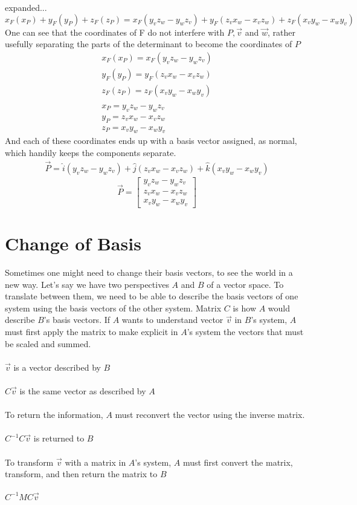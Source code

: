 \documentclass{article}
\begin{document}
expanded...
\[
    x_{F}(x_{P}) + y_{F}(y_{P}) + z_{F}(z_{P}) = x_{F}(y_{v}z_{w} - y_{w}z_{v}) + y_{F}(z_{v}x_{w} - x_{v}z_{w}) + z_{F}(x_{v}y_{w} - x_{w}y_{v})\]
One can see that the coordinates of F do not interfere with $P, \vec{v}$ and $\vec{w}$, rather usefully separating the parts of the determinant to become the coordinates of $P$
\begin{align*}
    x_{F}(x_{P}) = x_{F}(y_{v}z_{w} - y_{w}z_{v})\\
    y_{F}(y_{P}) = y_{F}(z_{v}x_{w} - x_{v}z_{w})\\
    z_{F}(z_{P}) = z_{F}(x_{v}y_{w} - x_{w}y_{v})\\ \\
    x_{P} = y_{v}z_{w} - y_{w}z_{v}\\
    y_{P} = z_{v}x_{w} - x_{v}z_{w}\\
    z_{P} = x_{v}y_{w} - x_{w}y_{v}
\end{align*}
And each of these coordinates ends up with a basis vector assigned, as normal, which handily keeps the components separate.
\begin{align*}
    \vec{P} = \hat{i}(y_{v}z_{w} - y_{w}z_{v}) + \hat{j}(z_{v}x_{w} - x_{v}z_{w}) + \hat{k}(x_{v}y_{w} - x_{w}y_{v})
\end{align*}
\[ \vec{P} = \begin{bmatrix}
    y_{v}z_{w} - y_{w}z_{v}\\
    z_{v}x_{w} - x_{v}z_{w}\\
    x_{v}y_{w} - x_{w}y_{v}
\end{bmatrix}
\]
\section{Change of Basis}
Sometimes one might  need to change their basis vectors, to see the world in a new way. Let's say we have two perspectives $A$ and $B$ of a vector space. To translate between them, we need to be able to describe the basis vectors of one system using the basis vectors of the other system. Matrix $C$ is how $A$ would describe $B$'s basis vectors. If $A$ wants to understand vector $\vec{v}$ in $B$'s system, $A$ must first apply the matrix to make explicit in $A$'s system the vectors that must be scaled and summed.
\\ \\
$\vec{v}$ is a vector described by $B$
\\ \\
$C\vec{v}$ is the same vector as described by $A$\\ \\
To return the information, $A$ must reconvert the vector using the inverse matrix.\\ \\
$C^{-1}C\vec{v}$ is returned to $B$\\\\
To transform $\vec{v}$ with a matrix in $A$'s system, $A$ must first convert the matrix, transform, and then return the matrix to $B$\\ \\
$C^{-1}MC\vec{v}$
\end{document}
